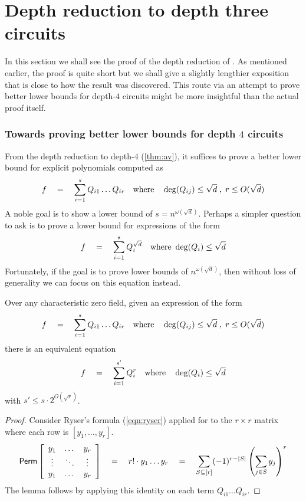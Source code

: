 \section{Depth reduction to depth three circuits}\label{sec:depth-3-red}

In this section we shall see the proof of the depth reduction of
\cite{gkks13b}.
As mentioned earlier, the proof is quite short but we shall give a
slightly lengthier exposition that is close to how the result was
discovered.
This route via an attempt to prove better lower bounds for depth-$4$
circuits might be more insightful than the actual proof itself. 

\subsubsection{Towards proving better lower bounds for depth $4$ circuits}

From the depth reduction to depth-$4$ (\autoref{thm:av}), it suffices to
prove a better lower bound for explicit polynomials computed as
\begin{equation}\label{eqn:d4-LB}
f\quad = \quad \sum_{i=1}^s Q_{i1}\dots Q_{ir} \quad\text{where}\quad \deg(Q_{ij})\leq \sqrt{d}\;,\; r\leq O(\sqrt{d})
\end{equation}
A noble goal is to show a lower bound of $s = n^{\omega(\sqrt{d})}$.
Perhaps a simpler question to ask is to prove a lower bound for
expressions of the form
\begin{equation}\label{eqn:d4pow-LB}
f\quad = \quad \sum_{i=1}^s Q_{i}^{\sqrt{d}} \quad\text{where }\deg(Q_i)\leq \sqrt{d}
\end{equation}
Fortunately, if the goal is to prove lower bounds of
$n^{\omega(\sqrt{d})}$, then without loss of generality we can focus
on this equation instead.

\begin{lemma}\label{lem:fischer}
  Over any characteristic zero field, given an expression of the form
  \[
  f\quad = \quad \sum_{i=1}^s Q_{i1}\dots Q_{ir} \quad\text{where}\quad \deg(Q_{ij})\leq \sqrt{d}\;,\; r\leq O(\sqrt{d})
  \]
  there is an equivalent equation
  \[
  f\quad = \quad \sum_{i=1}^{s'} Q_{i}^r\quad\text{where}\quad \deg(Q_{i})\leq \sqrt{d}
  \]
  with $s' \leq s \cdot 2^{O(\sqrt{r})}$. 
\end{lemma}
\begin{proof}
  Consider Ryser's formula (\ref{eqn:ryser}) applied for to the
  $r\times r$ matrix where each row is $[y_1,\dots, y_r]$. 
  \[
  \operatorname{\mathsf{Perm}} \left[\begin{array}{ccc} y_1 & \dots & y_r\\ \vdots & \ddots & \vdots \\ y_1 & \dots & y_r\end{array}\right] \quad = \quad r! \cdot y_1\dots y_r \quad = \quad \sum_{S\subseteq [r]} (-1)^{r- |S|} \left(\sum_{j\in S} y_j\right)^r
  \]
  The lemma follows by applying this identity on each term
  $Q_{i1}\dots Q_{ir}$. 
\end{proof}

